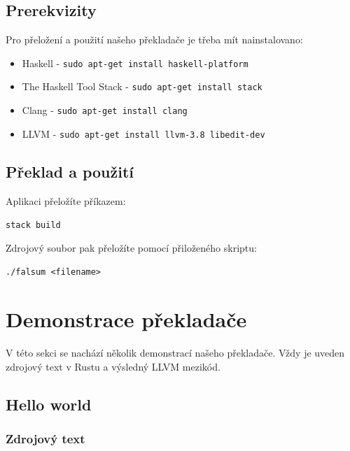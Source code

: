 \documentclass[12pt,a4paper]{article}
\begin{document}
\subsection{Prerekvizity}

Pro přeložení a použití našeho překladače je třeba mít nainstalovano:

\begin{itemize}
	\item Haskell - \texttt{sudo apt-get install haskell-platform}
    \item The Haskell Tool Stack - \texttt{sudo apt-get install stack}
    \item Clang - \texttt{sudo apt-get install clang}
    \item LLVM - \texttt{sudo apt-get install llvm-3.8 libedit-dev}
\end{itemize}


\subsection{Překlad a použití}

Aplikaci přeložíte příkazem:

\begin{center}
	\texttt{stack build}
\end{center}

Zdrojový soubor pak přeložíte pomocí přiloženého skriptu:

\begin{center}
	\texttt{./falsum <filename>}
\end{center}


\section{Demonstrace překladače}

V této sekci se nachází několik demonstrací našeho překladače. Vždy je uveden zdrojový text v Rustu a výsledný LLVM mezikód.

\subsection{Hello world}

\subsubsection{Zdrojový text}
\end{document}
